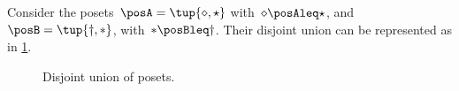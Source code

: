 \begin{example}
  Consider the posets~$\posA=\tup{\diamond, \star}$ with~$\diamond \posAleq \star$, and~$\posB=\tup{\dagger,\ast}$, with~$\ast \posBleq \dagger$. Their disjoint union can be represented as in \cref{fig:poset-coproduct}.

  \begin{figure}[h!]
    \centering
    \caption{Disjoint union of posets.}
    \label{fig:poset-coproduct}
  \end{figure}
\end{example}
